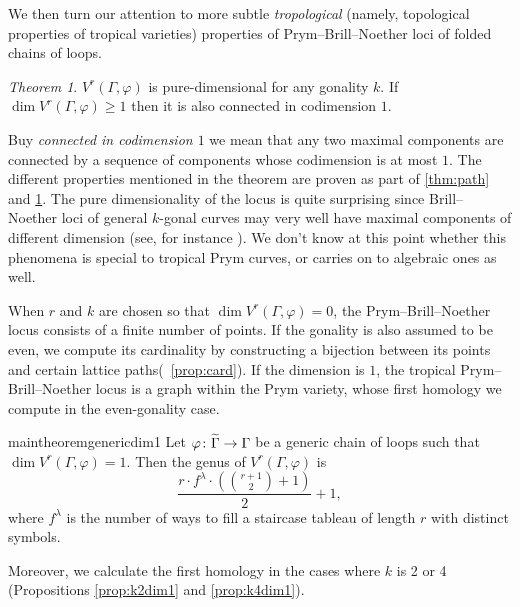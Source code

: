 \documentclass[11pt,reqno]{amsart}
\newcommand*{\maps}{\nobreak\mskip2mu\mathpunct{}\nonscript
  \mkern-\thinmuskip{:}\mskip6muplus1mu\relax}
\newcommand*{\wti}[1]{\widetilde{#1}}
\theoremstyle{definition}
\theoremstyle{problem}
\theoremstyle{plain}
\theoremstyle{remark}
\theoremstyle{theorem}
\newtheorem{maintheorem}{Theorem}
\numberwithin{equation}{section}
\numberwithin{figure}{section}
\theoremstyle{definition}
\theoremstyle{problem}
\theoremstyle{plain}
\begin{document}




We then turn our attention to more subtle \emph{tropological} (namely, topological properties of tropical varieties)
properties of Prym--Brill--Noether loci of folded chains of loops. 
\begin{maintheorem}\label{thm:pure-dim}
	$V^r(\Gamma,\varphi)$ is pure-dimensional for any gonality $k$. If $\dim V^r(\Gamma,\varphi)\geq 1$ then it is also connected in codimension $1$.
\end{maintheorem}
Buy \emph{connected in codimension $1$} we mean that any two maximal components are connected by a sequence of components whose codimension is at most $1$.
The different properties mentioned in the theorem are proven as part of  \cref{thm:path} and  \cref{thm:pure-dim}.
 The pure dimensionality of the locus is quite surprising since Brill--Noether loci of general $k$-gonal curves may very well  have maximal components of different dimension  (see, for instance \cite[Example 2.4]{Cook_Jensen_BN_Components}).  We don't know at this point whether this phenomena is special to tropical Prym curves, or carries on to algebraic ones as well. 



When $r$ and $k$ are
chosen so that $\dim V^r(\Gamma,\varphi)=0$, the Prym--Brill--Noether locus consists of a
finite number of points.  If the gonality is also assumed to be
even, we compute its cardinality by constructing a bijection between  its points and certain lattice paths(~\cref{prop:card}).  
 If
the dimension is $1$, the tropical Prym--Brill--Noether locus is a
graph within the Prym variety, whose first homology we compute in the even-gonality case. 
\begin{restatable}{maintheorem}{genericdim1}
  \label{genericdim1}
Let $\varphi\maps\wti\Gamma\to\Gamma$ be a generic chain of loops such that $\dim V^r(\Gamma,\varphi)=1$. Then the genus of 
$V^r(\Gamma,\varphi)$ is
  \begin{equation}
    \frac{r \cdot f^{\lambda}\cdot (\binom{r+1}{2}+1)}{2} + 1,
  \end{equation}
  where $f^\lambda$ is the number of ways to fill a staircase tableau of length $r$ with distinct symbols. 
\end{restatable}
\noindent Moreover, we calculate the first homology in the cases where
$k$ is 2 or 4 (Propositions \ref{prop:k2dim1} and \ref{prop:k4dim1}).  
\end{document}
